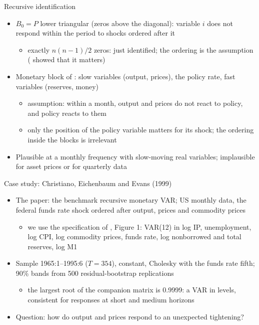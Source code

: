 \begin{frame}{Recursive identification}
\itemsize{\small}
\begin{itemize}
    \item $B_0 = P$ lower triangular (zeros above the diagonal): variable $i$ does not respond within the period to shocks ordered after it
    \begin{itemize}
        \item exactly $n(n - 1)/2$ zeros: just identified; the ordering is the assumption ( showed that it matters)
    \end{itemize}
    \item Monetary block of : slow variables (output, prices), the policy rate, fast variables (reserves, money)
    \begin{itemize}
        \item assumption: within a month, output and prices do not react to policy, and policy reacts to them
        \item only the position of the policy variable matters for its shock; the ordering inside the blocks is irrelevant
    \end{itemize}
    \item Plausible at a monthly frequency with slow-moving real variables; implausible for asset prices or for quarterly data
\end{itemize}
\end{frame}

\begin{frame}{Case study: Christiano, Eichenbaum and Evans (1999)}
\itemsize{\small}
\begin{itemize}
    \item The paper: the benchmark recursive monetary VAR; US monthly data, the federal funds rate shock ordered after output, prices and commodity prices 
    \begin{itemize}
        \item we use the specification of , Figure 1: VAR(12) in log IP, unemployment, log CPI, log commodity prices, funds rate, log nonborrowed and total reserves, log M1
    \end{itemize}
    \item Sample 1965:1--1995:6 ($T = 354$), constant, Cholesky with the funds rate fifth; 90\% bands from 500 residual-bootstrap replications
    \begin{itemize}
        \item the largest root of the companion matrix is 0.9999: a VAR in levels, consistent for responses at short and medium horizons 
    \end{itemize}
    \item Question: how do output and prices respond to an unexpected tightening?
\end{itemize}
\end{frame}

